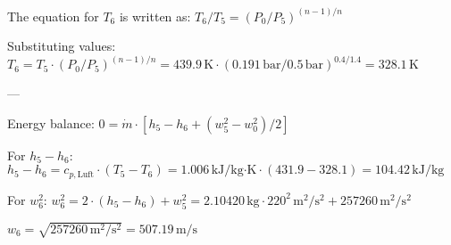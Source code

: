 The equation for \( T_6 \) is written as:  
\( T_6 / T_5 = (P_0 / P_5)^{(n-1)/n} \)  

Substituting values:  
\( T_6 = T_5 \cdot (P_0 / P_5)^{(n-1)/n} = 439.9 \, \text{K} \cdot (0.191 \, \text{bar} / 0.5 \, \text{bar})^{0.4/1.4} = 328.1 \, \text{K} \)  

---

Energy balance:  
\( 0 = \dot{m} \cdot [h_5 - h_6 + (w_5^2 - w_0^2) / 2] \)  

For \( h_5 - h_6 \):  
\( h_5 - h_6 = c_{p,\text{Luft}} \cdot (T_5 - T_6) = 1.006 \, \text{kJ/kg·K} \cdot (431.9 - 328.1) = 104.42 \, \text{kJ/kg} \)  

For \( w_6^2 \):  
\( w_6^2 = 2 \cdot (h_5 - h_6) + w_5^2 = 2.10420 \, \text{kg} \cdot 220^2 \, \text{m}^2/\text{s}^2 + 257260 \, \text{m}^2/\text{s}^2 \)  

\( w_6 = \sqrt{257260 \, \text{m}^2/\text{s}^2} = 507.19 \, \text{m/s} \)